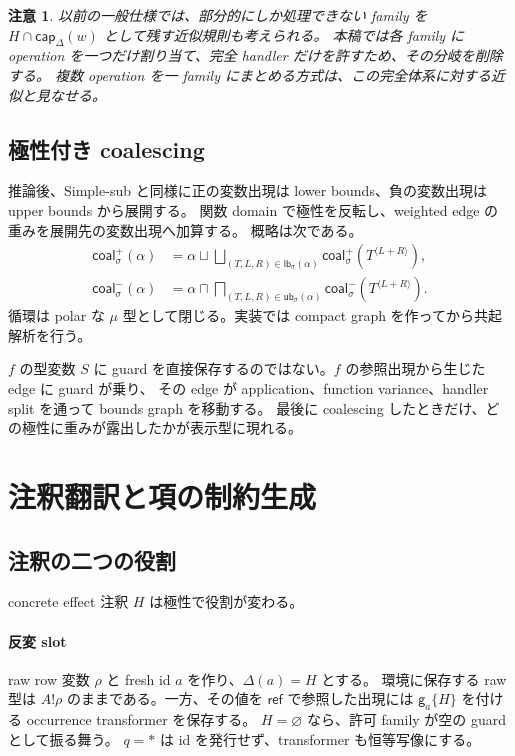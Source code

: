\documentclass[uplatex,dvipdfmx,a4paper,11pt]{jsarticle}
\theoremstyle{jpplain}
\newtheorem{remark}[definition]{注意}
\newcommand{\join}{\mathbin{\sqcup}}
\newcommand{\meet}{\mathbin{\sqcap}}
\newcommand{\eff}{\mathbin{!}}
\newcommand{\emptyrow}{\varnothing}
\newcommand{\starann}{\ast}
\newcommand{\gatom}[2]{\mathsf g_{#1}\!\{#2\}}
\newcommand{\capW}[2]{\mathsf{cap}_{#1}(#2)}
\newcommand{\wocc}[2]{#1^{\langle #2\rangle}}
\newcommand{\lb}{\mathsf{lb}}
\newcommand{\ub}{\mathsf{ub}}
\newcommand{\coalesce}{\mathsf{coal}}
\begin{document}
\begin{remark}
以前の一般仕様では、部分的にしか処理できない family を $H\cap\capW\Delta w$ として残す近似規則も考えられる。
本稿では各 family に operation を一つだけ割り当て、完全 handler だけを許すため、その分岐を削除する。
複数 operation を一 family にまとめる方式は、この完全体系に対する近似と見なせる。
\end{remark}

\subsection{極性付き coalescing}

推論後、Simple-sub と同様に正の変数出現は lower bounds、負の変数出現は upper bounds から展開する。
関数 domain で極性を反転し、weighted edge の重みを展開先の変数出現へ加算する。
概略は次である。
\[
\begin{aligned}
 \coalesce_\sigma^+(\alpha)
   &= \alpha\join
      \bigsqcup_{(T,L,R)\in\lb_\sigma(\alpha)}
        \coalesce_\sigma^+(\wocc T{L+R}),\\
 \coalesce_\sigma^-(\alpha)
   &= \alpha\meet
      \bigsqcap_{(T,L,R)\in\ub_\sigma(\alpha)}
        \coalesce_\sigma^-(\wocc T{L+R}).
\end{aligned}
\]
循環は polar な $\mu$ 型として閉じる。実装では compact graph を作ってから共起解析を行う。

\begin{intuition}
$f$ の型変数 $S$ に guard を直接保存するのではない。$f$ の参照出現から生じた edge に guard が乗り、
その edge が application、function variance、handler split を通って bounds graph を移動する。
最後に coalescing したときだけ、どの極性に重みが露出したかが表示型に現れる。
\end{intuition}

\section{注釈翻訳と項の制約生成}

\subsection{注釈の二つの役割}

concrete effect 注釈 $H$ は極性で役割が変わる。

\paragraph{反変 slot}
raw row 変数 $\rho$ と fresh id $a$ を作り、$\Delta(a)=H$ とする。
環境に保存する raw 型は $A\eff\rho$ のままである。一方、その値を \(\mathsf{ref}\) で参照した出現には
$\gatom aH$ を付ける occurrence transformer を保存する。
$H=\emptyrow$ なら、許可 family が空の guard として振る舞う。
$q=\starann$ は id を発行せず、transformer も恒等写像にする。
\end{document}
